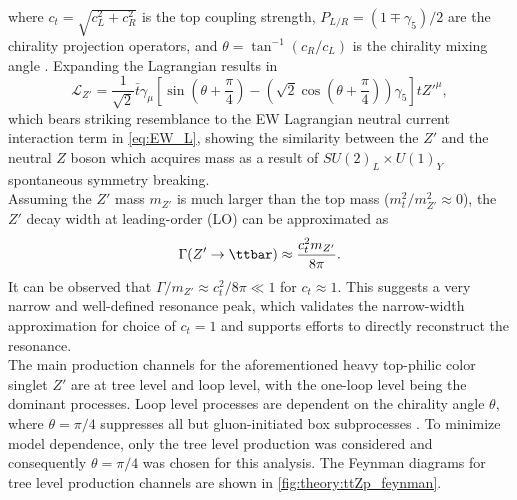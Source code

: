 \documentclass[../thesis.tex]{subfiles}
\begin{document}
where $c_t=\sqrt{c_L^2+c_R^2}$ is the top coupling strength, $P_{L/R}=(1\mp \gamma_5)/2$ are the chirality projection operators, and $\theta = \tan^{-1}(c_R/c_L)$ is the chirality mixing angle \citep{theory:ttZp}. Expanding the Lagrangian results in
\begin{equation}
\mathcal{L}_{Z'} = \frac{1}{\sqrt{2}}\bar{t}\gamma_\mu\left[
\sin\left(\theta+\frac{\pi}{4}\right) - \left(\sqrt{2}\cos\left(\theta+\frac{\pi}{4}\right)\right)\gamma_5
\right] tZ'^{\mu},
\end{equation}
which bears striking resemblance to the \acs{EW} Lagrangian neutral current interaction term in \autoref{eq:EW_L}, showing the similarity between the $Z'$ and the neutral $Z$ boson which acquires mass as a result of $SU(2)_L\times U(1)_Y$ spontaneous symmetry breaking.\\
Assuming the $Z'$ mass $m_{Z'}$ is much larger than the top mass ($m_t^2/m_{Z'}^2 \approx 0$), the $Z'$ decay width at leading-order (\acs{LO}) can be approximated as
\begin{equation}
\Gamma(Z' \rightarrow \ttbar) \approx \frac{c_t^2 m_{Z'}}{8\pi}.
\end{equation}
It can be observed that $\Gamma/m_{Z'} \approx c_t^2/8\pi \ll 1$ for $c_t\approx 1$. This suggests a very narrow and well-defined resonance peak, which validates the narrow-width approximation for choice of $c_t=1$ and supports efforts to directly reconstruct the resonance.\\
The main production channels for the aforementioned heavy top-philic color singlet $Z'$ are at tree level and loop level, with the one-loop level being the dominant processes. Loop level processes are dependent on the chirality angle $\theta$, where $\theta=\pi/4$ suppresses all but gluon-initiated box subprocesses \citep{theory:ttZp}. To minimize model dependence, only the tree level production was considered and consequently $\theta=\pi/4$ was chosen for this analysis. The Feynman diagrams for tree level production channels are shown in \autoref{fig:theory:ttZp_feynman}.
\end{document}
